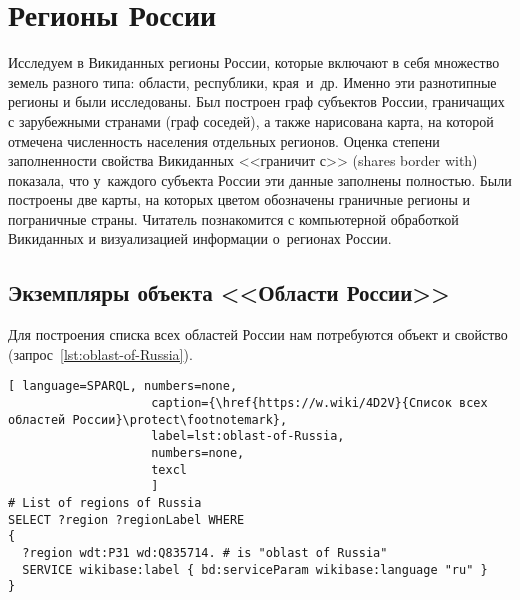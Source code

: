 ﻿\chapter{Регионы России}
\label{ch:oblast-of-Russia}
%
\label{question:q_subjects_of_Russia_3}


Исследуем в Викиданных регионы России, которые включают в себя множество земель разного 
типа: области, республики, края~и~др. Именно эти разнотипные регионы 
и были исследованы. 
Был построен граф субъектов России, граничащих с зарубежными странами (граф соседей), 
а также нарисована карта, 
на которой отмечена численность населения отдельных регионов. 
Оценка степени заполненности свойства Викиданных <<граничит с>> (shares border with) 
показала, что у~каждого субъекта России эти данные заполнены полностью. 
Были построены две карты, на которых цветом обозначены граничные регионы и пограничные страны.
Читатель познакомится с компьютерной обработкой Викиданных и визуализацией 
информации о~регионах России.



\section{Экземпляры объекта <<Области России>>}

Для построения списка всех областей России нам потребуются объект 
 и свойство  
(запрос~\ref{lst:oblast-of-Russia}).


\begin{lstlisting}[ language=SPARQL, numbers=none,
                    caption={\href{https://w.wiki/4D2V}{Список всех областей России}\protect\footnotemark},
                    label=lst:oblast-of-Russia,
                    numbers=none,
                    texcl 
                    ]
# List of regions of Russia
SELECT ?region ?regionLabel WHERE
{
  ?region wdt:P31 wd:Q835714. # is "oblast of Russia"
  SERVICE wikibase:label { bd:serviceParam wikibase:language "ru" }
}
\end{lstlisting}%


